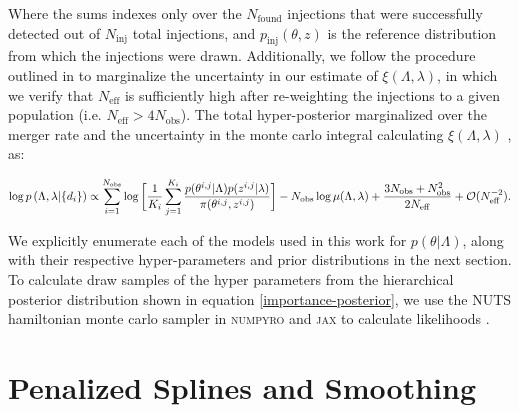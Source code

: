 \noindent
Where the sums indexes only over the $N_\mathrm{found}$ injections that were successfully detected out of $N_\mathrm{inj}$ total injections, 
and $p_\mathrm{inj}(\theta, z)$ is the reference distribution from which the injections were drawn. Additionally, we follow the procedure 
outlined in \citet{Farr_2019} to marginalize the uncertainty in our estimate of $\xi(\Lambda, \lambda)$, in which we verify that $N_\mathrm{eff}$ is 
sufficiently high after re-weighting the injections to a given population (i.e. $N_\mathrm{eff} > 4N_\mathrm{obs}$). 
The total hyper-posterior marginalized over the merger rate and the uncertainty in the monte carlo integral calculating $\xi(\Lambda, \lambda)$ \citep{Farr_2019}, as:

\begin{equation}\label{importance-posterior}
    \log p\left(\Lambda, \lambda | \{d_i\}\right) \propto \sum_{i=1}^{N_\mathrm{obs}} \log \bigg[ \frac{1}{K_i} \sum_{j=1}^{K_i} \frac{p(\theta^{i,j}|\Lambda)p(z^{i,j}|\lambda)}{\pi(\theta^{i,j}, z^{i,j})} \bigg] -  \\
    N_\mathrm{obs} \log \mu(\Lambda, \lambda) + \frac{3N_\mathrm{obs} + N_\mathrm{obs}^2}{2N_\mathrm{eff}} + \mathcal{O}(N_\mathrm{eff}^{-2}).
\end{equation}

We explicitly enumerate each of the models used in this work for $p(\theta|\Lambda)$, along with 
their respective hyper-parameters and prior distributions in the next section. To calculate draw 
samples of the hyper parameters from the hierarchical posterior distribution shown in equation \ref{importance-posterior}, we use the 
NUTS hamiltonian monte carlo sampler in \textsc{numpyro} and \textsc{jax} to calculate likelihoods .

\section{Penalized Splines and Smoothing}\label{sec:psplines}

